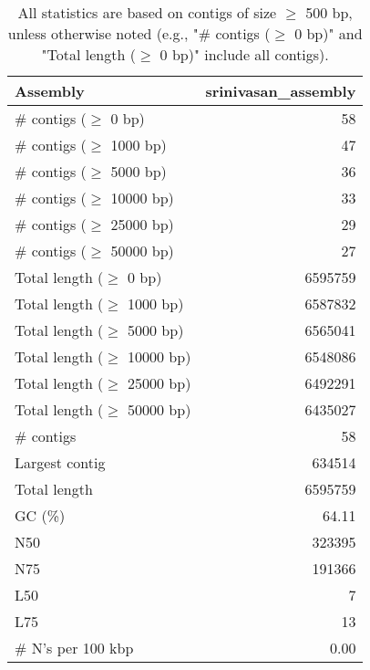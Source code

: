 \documentclass[12pt,a4paper]{article}
\begin{document}
\begin{table}[ht]
\begin{center}
\caption{All statistics are based on contigs of size $\geq$ 500 bp, unless otherwise noted (e.g., "\# contigs ($\geq$ 0 bp)" and "Total length ($\geq$ 0 bp)" include all contigs).}
\begin{tabular}{|l*{1}{|r}|}
\hline
Assembly & srinivasan\_assembly \\ \hline
\# contigs ($\geq$ 0 bp) & 58 \\ \hline
\# contigs ($\geq$ 1000 bp) & 47 \\ \hline
\# contigs ($\geq$ 5000 bp) & 36 \\ \hline
\# contigs ($\geq$ 10000 bp) & 33 \\ \hline
\# contigs ($\geq$ 25000 bp) & 29 \\ \hline
\# contigs ($\geq$ 50000 bp) & 27 \\ \hline
Total length ($\geq$ 0 bp) & 6595759 \\ \hline
Total length ($\geq$ 1000 bp) & 6587832 \\ \hline
Total length ($\geq$ 5000 bp) & 6565041 \\ \hline
Total length ($\geq$ 10000 bp) & 6548086 \\ \hline
Total length ($\geq$ 25000 bp) & 6492291 \\ \hline
Total length ($\geq$ 50000 bp) & 6435027 \\ \hline
\# contigs & 58 \\ \hline
Largest contig & 634514 \\ \hline
Total length & 6595759 \\ \hline
GC (\%) & 64.11 \\ \hline
N50 & 323395 \\ \hline
N75 & 191366 \\ \hline
L50 & 7 \\ \hline
L75 & 13 \\ \hline
\# N's per 100 kbp & 0.00 \\ \hline
\end{tabular}
\end{center}
\end{table}
\end{document}
